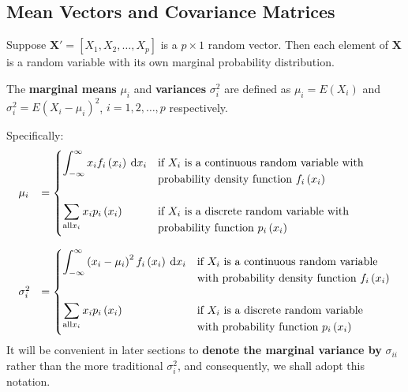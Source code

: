 \documentclass[a4paper]{article}
\newcommand{\highspace}{\vspace{1.2em}\noindent}
\begin{document}
    \subsection{Mean Vectors and Covariance Matrices}

    Suppose $\mathbf{X}' = \left[X_{1}, X_{2}, \dots, X_{p}\right]$ is a $p \times 1$ random vector. Then each element of $\mathbf{X}$ is a random variable with its own marginal probability distribution. 
    
    \noindent
    The \textbf{marginal means} $\mu_{i}$ and \textbf{variances} $\sigma^{2}_{i}$ are defined as $\mu_{i} = E\left(X_{i}\right)$ and $\sigma_{i}^{2} = E\left(X_{i} - \mu_{i}\right)^{2}$, $i=1,2,\dots,p$ respectively.

    \highspace
    Specifically:
    \begin{equation}
        \begin{array}{ll}
            \mu_{i} &= \begin{cases}
                \displaystyle\int_{-\infty}^{\infty} x_{i}f_{i}\left(x_{i}\right) \:\mathrm{d}x_{i}
                & \text{if }X_{i}\text{ is a continuous random variable with} \vspace{-.5em} \\
                & \text{probability density function }f_{i}\left(x_{i}\right) \\
                \\
                \displaystyle\sum_{\text{all} x_{i}} x_{i}p_{i}\left(x_{i}\right)
                & \text{if }X_{i}\text{ is a discrete random variable with} \vspace{-.9em} \\
                & \text{probability function }p_{i}\left(x_{i}\right)
            \end{cases}
            \\
            \\
            \sigma_{i}^{2} &= \begin{cases}
                \displaystyle\int_{-\infty}^{\infty} \left(x_{i} - \mu_{i}\right)^{2} f_{i}\left(x_{i}\right) \:\mathrm{d}x_{i}
                & \text{if }X_{i}\text{ is a continuous random variable} \vspace{-.5em} \\
                & \text{with probability density function }f_{i}\left(x_{i}\right) \\
                \\
                \displaystyle\sum_{\text{all} x_{i}} x_{i}p_{i}\left(x_{i}\right)
                & \text{if }X_{i}\text{ is a discrete random variable} \vspace{-.9em} \\
                & \text{with probability function }p_{i}\left(x_{i}\right)
            \end{cases}
        \end{array}
    \end{equation}
    It will be convenient in later sections to \textbf{denote the marginal variance by} $\sigma_{ii}$ rather than the more traditional $\sigma_{i}^{2}$, and consequently, we shall adopt this notation.
\end{document}
